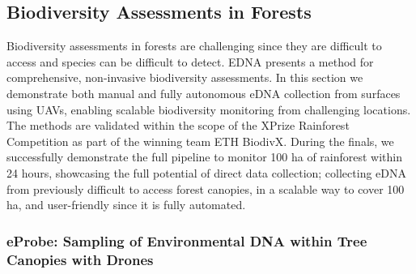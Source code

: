 \subsection{Biodiversity Assessments in Forests}


Biodiversity assessments in forests are challenging since they are difficult to access and species can be difficult to detect. EDNA presents a method for comprehensive, non-invasive biodiversity assessments. In this section we demonstrate both manual and fully autonomous eDNA collection from surfaces using UAVs, enabling scalable biodiversity monitoring from challenging locations. The methods are validated within the scope of the XPrize Rainforest Competition as part of the winning team ETH BiodivX. During the finals, we successfully demonstrate the full pipeline to monitor 100 ha of rainforest within 24 hours, showcasing the full potential of direct data collection; collecting eDNA from previously difficult to access forest canopies, in a scalable way to cover 100 ha, and user-friendly since it is fully automated.

\subsubsection{eProbe: Sampling of Environmental DNA within Tree Canopies with Drones \cite{Kirchgeorg2024}}

